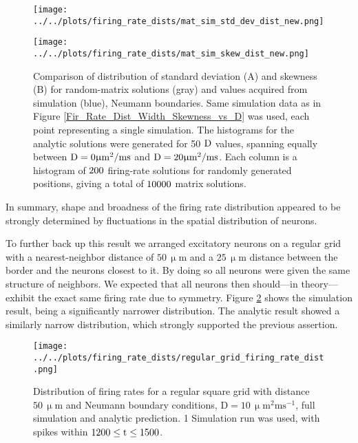 \documentclass[10pt,a4paper]{article}
\begin{document}
\begin{figure}
\begin{minipage}{0.5\textwidth}
\texttt{[image: ../../plots/firing\_rate\_dists/mat\_sim\_std\_dev\_dist\_new.png]}
\end{minipage}
\begin{minipage}{0.5\textwidth}
\texttt{[image: ../../plots/firing\_rate\_dists/mat\_sim\_skew\_dist\_new.png]}
\end{minipage}
\caption[Comparison of distribution of standard deviation and skewness for random-matrix solutions and simulation data]{Comparison of distribution of standard deviation (A) and skewness (B) for random-matrix solutions (gray) and values acquired from simulation (blue), Neumann boundaries. Same simulation data as in Figure \ref{Fir_Rate_Dist_Width_Skewness_vs_D} was used, each point representing a single simulation. The histograms for the analytic solutions were generated for 50 $\rm D$ values, spanning equally between $\rm D=0 \upmu m^2 /ms$ and $\rm D=20 \upmu m^2 /ms$. Each column is a histogram of $\rm 200$ firing-rate solutions for randomly generated positions, giving a total of $\rm 10000$ matrix solutions.}
\label{Std_Skew_Dist_vs_Data}
\end{figure}
In summary, shape and broadness of the firing rate distribution appeared to be strongly determined by fluctuations in the spatial distribution of neurons.

To further back up this result we arranged excitatory neurons on a regular grid with a nearest-neighbor distance of $\mathrm{50\, \upmu m}$ and a $\mathrm{25\, \upmu m}$ distance between the border and the neurons closest to it. By doing so all neurons were given the same structure of neighbors. We expected that all neurons then should---in theory---exhibit the exact same firing rate due to symmetry. Figure \ref{Fir_Rate_Dist_Reg_Grid} shows the simulation result, being a significantly narrower distribution. The analytic result showed a similarly narrow distribution, which strongly supported the previous assertion.
\begin{figure}
\begin{center}
\texttt{[image: ../../plots/firing\_rate\_dists/regular\_grid\_firing\_rate\_dist.png]}
\end{center}
\caption[Distribution of firing rates for a regular square grid]{Distribution of firing rates for a regular square grid with distance $\mathrm{50\, \upmu m}$ and Neumann boundary conditions, $\mathrm{D=10\, \upmu m^2 ms^{-1}}$, full simulation and analytic prediction. 1 Simulation run was used, with spikes within $\rm 1200 \leq t \leq 1500$.}
\label{Fir_Rate_Dist_Reg_Grid}
\end{figure}  
\end{document}
